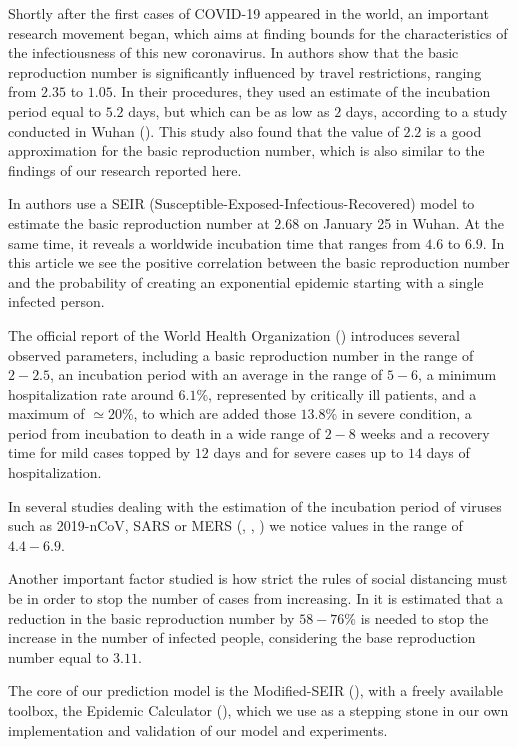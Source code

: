 \documentclass[11pt]{article}
\begin{document}
Shortly after the first cases of COVID-19 appeared in the world, an important research movement began, which aims at finding bounds for the characteristics of the infectiousness of this new coronavirus. In \cite{Kucharski2020.01.31.20019901} authors show that the basic reproduction number is significantly influenced by travel restrictions, ranging from $2.35$ to $1.05$. In their procedures, they used an estimate of the incubation period equal to $5.2$ days, but which can be as low as $2$ days, according to a study conducted in Wuhan (\cite{doi:10.1056/NEJMoa2001316}). This study also found that the value of $2.2$ is a good approximation for the basic reproduction number, which is also similar to the findings of our research reported here.

In \cite{WU2020689} authors use a SEIR (Susceptible-Exposed-Infectious-Recovered) model to estimate the basic reproduction number at $2.68$ on January 25 in Wuhan. At the same time, it reveals a worldwide incubation time that ranges from $4.6$ to $6.9$. In this article we see the positive correlation between the basic reproduction number and the probability of creating an exponential epidemic starting with a single infected person.

The official report of the World Health Organization (\cite{who-report}) introduces several observed parameters, including a basic reproduction number in the range of $2-2.5$, an incubation period with an average in the range of $5-6$, a minimum hospitalization rate around $6.1 \%$, represented by critically ill patients, and a maximum of $\simeq 20 \%$, to which are added those $13.8 \%$ in severe condition, a period from incubation to death in a wide range of $2-8$ weeks and a recovery time for mild cases topped by $12$ days and for severe cases up to $14$ days of hospitalization.

In several studies dealing with the estimation of the incubation period of viruses such as 2019-nCoV, SARS or MERS (\cite{PMID:32046819}, \cite{article:lau}, \cite{article:virlogeux}) we notice values in the range of $4.4-6.9$.

Another important factor studied is how strict the rules of social distancing must be in order to stop the number of cases from increasing. In \cite{Read2020.01.23.20018549} it is estimated that a reduction in the basic reproduction number by $58-76 \%$ is needed to stop the increase in the number of infected people, considering the base reproduction number equal to $3.11$.

The core of our prediction model is the Modified-SEIR (\cite{chowdhury2020dynamic}), with a freely available toolbox, the Epidemic Calculator (\cite{gabgoh}), which we use as a stepping stone in our own implementation and validation of our model and experiments. 
\end{document}
